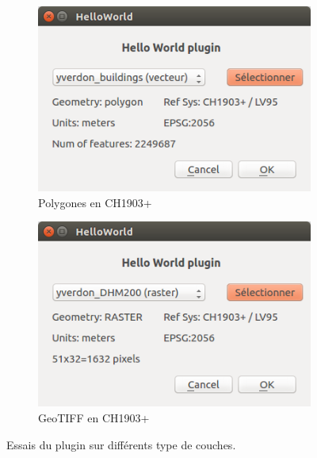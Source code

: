 \documentclass[11pt]{article}
\begin{document}
\begin{enumerate}
\begin{minipage}[t]{0.9\paperwidth}
\begin{figure}[H]
\begin{subfigure}[t]{0.44\textwidth}
        \centering
        \includegraphics[width=1\textwidth]{plugintest4_4.png}
        \caption{Polygones en CH1903+}\label{plugintest:3}
    \end{subfigure}
    \begin{subfigure}[t]{0.44\textwidth}
		\centering
        \includegraphics[width=1\textwidth]{plugintest5_4.png}
		\caption{GeoTIFF en CH1903+}\label{plugintest:4}
    \end{subfigure}%
    \caption[Essais du plugin sur différents type de couches.]{Essais du plugin sur différents type de couches.}
    \label{plugintest}
\end{figure}
\end{minipage}
\vspace*{-1em}


\end{enumerate}
\end{document}
